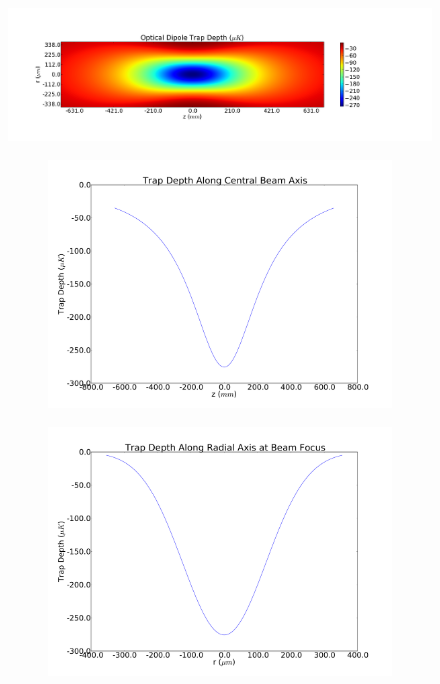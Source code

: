 \begin{figure}[H]
\centering
\includegraphics[width=\textwidth]{figs/2dtrapdepth.pdf}

\begin{subfigure}[b]{0.5\textwidth}
\includegraphics[width=\textwidth]{figs/longtrapdepth.pdf}
\end{subfigure}\begin{subfigure}[b]{0.5\textwidth}
\includegraphics[width=\textwidth]{figs/radtrapdepth.pdf}
\end{subfigure}


\end{figure}

